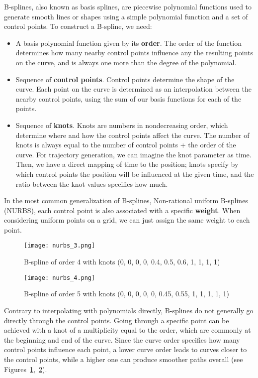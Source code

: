B-splines, also known as basis splines, are piecewise polynomial functions used to generate smooth lines or shapes using a simple polynomial function and a set of control points.
To construct a B-spline, we need:

\begin{itemize}
\item A basis polynomial function given by its \textbf{order}. The order of the function determines how many nearby control points influence any the resulting points on the curve, and is always one more than the degree of the polynomial.
\item Sequence of \textbf{control points}. Control points determine the shape of the curve. Each point on the curve is determined as an interpolation between the nearby control points, using the sum of our basis functions for each of the points.
\item Sequence of \textbf{knots}. Knots are numbers in nondecreasing order, which determine where and how the control points affect the curve. The number of knots is always equal to the number of control points + the order of the curve. For trajectory generation, we can imagine the knot parameter as time. Then, we have a direct mapping of time to the position; knots specify by which control points the position will be influenced at the given time, and the ratio between the knot values specifies how much.
\end{itemize}

In the most common generalization of B-splines, Non-rational uniform B-splines (NURBS), each control point is also associated with a specific \textbf{weight}. When considering uniform points on a grid, we can just assign the same weight to each point.

\begin{figure}
  \centering
  \texttt{[image: nurbs\_3.png]}
  \caption{B-spline of order 4 with knots (0, 0, 0, 0, 0.4, 0.5, 0.6, 1, 1, 1, 1)}\label{fig:nurbs4}
\end{figure}

\begin{figure}
  \centering
  \texttt{[image: nurbs\_4.png]}
  \caption{B-spline of order 5 with knots (0, 0, 0, 0, 0, 0.45, 0.55, 1, 1, 1, 1, 1)}\label{fig:nurbs5}
\end{figure}

Contrary to interpolating with polynomials directly, B-splines do not generally go directly through the control points. Going through a specific point can be achieved with a knot of a multiplicity equal to the order, which are commonly at the beginning and end of the curve. Since the curve order specifies how many control points influence each point, a lower curve order leads to curves closer to the control points, while a higher one can produce smoother paths overall (see Figures~\ref{fig:nurbs4},~\ref{fig:nurbs5}).


